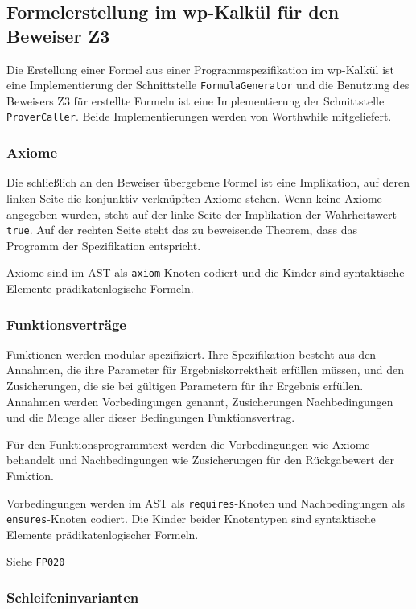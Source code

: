 \subsection{Formelerstellung im wp-Kalkül für den Beweiser Z3}%

Die Erstellung einer Formel aus einer Programmspezifikation im
wp-Kalkül ist eine Implementierung der Schnittstelle
\texttt{FormulaGenerator} und die Benutzung des Beweisers Z3 für
erstellte Formeln ist eine Implementierung der Schnittstelle
\texttt{ProverCaller}. Beide Implementierungen werden von Worthwhile
mitgeliefert.%

\subsubsection{Axiome}%

Die schließlich an den Beweiser übergebene Formel ist eine
Implikation, auf deren linken Seite die konjunktiv verknüpften Axiome
stehen. Wenn keine Axiome angegeben wurden, steht auf der linke Seite
der Implikation der Wahrheitswert \texttt{true}. Auf der rechten Seite
steht das zu beweisende Theorem, dass das Programm der Spezifikation
entspricht.%

Axiome sind im AST als \texttt{axiom}-Knoten codiert und die Kinder
sind syntaktische Elemente prädikatenlogische Formeln.%

\subsubsection{Funktionsverträge}%

Funktionen werden modular spezifiziert. Ihre Spezifikation besteht aus
den Annahmen, die ihre Parameter für Ergebniskorrektheit erfüllen müssen, und den
Zusicherungen, die sie bei gültigen Parametern für ihr Ergebnis
erfüllen. Annahmen werden Vorbedingungen genannt, Zusicherungen
Nachbedingungen und die Menge aller dieser Bedingungen Funktionsvertrag.%

Für den Funktionsprogrammtext werden die Vorbedingungen wie Axiome behandelt
und Nachbedingungen wie Zusicherungen für den Rückgabewert der
Funktion.%

Vorbedingungen werden im AST als \texttt{requires}-Knoten und
Nachbedingungen als \texttt{ensures}-Knoten codiert. Die Kinder beider
Knotentypen sind syntaktische Elemente prädikatenlogischer Formeln.%

Siehe \texttt{FP020}%

\subsubsection{Schleifeninvarianten}%

